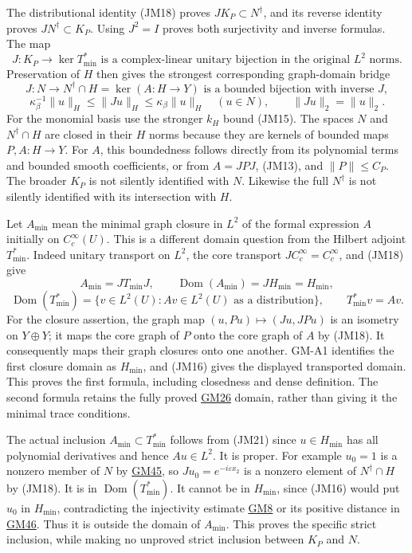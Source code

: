 \documentclass[
  11pt,
]{article}
\begin{document}
The distributional identity (JM18) proves \(J K_P\subset N^\dagger\), and
its reverse identity proves \(J N^\dagger\subset K_P\). Using
\(J^2=I\) proves both surjectivity and inverse formulas.
The map \[
 J:K_P\longrightarrow\ker T_{\min}^*
       \text{ is a complex-linear unitary bijection in the original }L^2\text{ norms}.
\] Preservation of \(H\)
then gives the strongest corresponding graph-domain bridge
\[
 J:N\longrightarrow N^\dagger\cap H=\ker(A:H\to Y)
       \text{ is a bounded bijection with inverse }J,
\] \[
 \kappa_\beta^{-1}\|u\|_H\leq\|Ju\|_H\leq\kappa_\beta\|u\|_H
       \quad(u\in N),
 \qquad
 \|Ju\|_2=\|u\|_2.
 \tag{JM20}
\] For the monomial basis
use the stronger \(k_H\) bound (JM15). The spaces
\(N\) and \(N^\dagger\cap H\) are closed in their
\(H\) norms because they are kernels of bounded maps
\(P,A:H\to Y\). For \(A\), this boundedness
follows directly from its polynomial terms and bounded smooth
coefficients, or from \(A=JPJ\), (JM13), and
\(\|P\|\leq C_P\). The broader \(K_P\) is not
silently identified with \(N\). Likewise the full
\(N^\dagger\) is not silently identified with its intersection
with \(H\).

Let \(A_{\min}\) mean the minimal graph closure in
\(L^2\) of the formal expression \(A\)
initially on \(C_c^\infty(U)\). This is a different domain
question from the Hilbert adjoint \(T_{\min}^*\). Indeed
unitary transport on \(L^2\), the core transport
\(JC_c^\infty=C_c^\infty\), and (JM18) give \[
 A_{\min}=JT_{\min}J,\qquad
 \operatorname{Dom}(A_{\min})=JH_{\min}=H_{\min},
\]
\[
 \operatorname{Dom}(T_{\min}^*)
       =\{v\in L^2(U):Av\in L^2(U)\text{ as a distribution}\},
 \qquad T_{\min}^*v=Av.
 \tag{JM21}
\] For the closure assertion, the graph map
\((u,Pu)\mapsto(Ju,JPu)\) is an isometry on \(Y\oplus Y\); it
maps the core graph of \(P\) onto the core graph of
\(A\) by (JM18). It consequently maps their graph
closures onto one another. GM-A1 identifies the first closure domain as
\(H_{\min}\), and (JM16) gives the displayed transported
domain. This proves the first formula, including closedness and dense
definition. The second formula retains the fully proved
\href{../u006-graph-domains/graph-domain-note.html\#eq-GM26}{GM26}
domain, rather than giving it the minimal trace conditions.

The actual inclusion \(A_{\min}\subset T_{\min}^*\) follows from (JM21) since
\(u\in H_{\min}\) has all polynomial derivatives and hence
\(Au\in L^2\). It is proper. For example
\(u_0=1\) is a nonzero member of \(N\)
by \href{../u006-graph-domains/graph-domain-note.html\#eq-GM45}{GM45},
so \(Ju_0=e^{-i\varepsilon x_2}\) is a nonzero element of
\(N^\dagger\cap H\) by (JM18). It is in \(\operatorname{Dom}(T_{\min}^*)\). It
cannot be in \(H_{\min}\), since (JM16) would put
\(u_0\) in \(H_{\min}\), contradicting the
injectivity estimate
\href{../u006-graph-domains/graph-domain-note.html\#eq-GM8}{GM8} or its
positive distance in
\href{../u006-graph-domains/graph-domain-note.html\#eq-GM46}{GM46}. Thus
it is outside the domain of \(A_{\min}\). This proves the
specific strict inclusion, while making no unproved strict inclusion
between \(K_P\) and \(N\).
\end{document}
